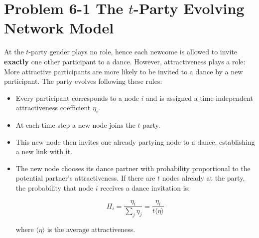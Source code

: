 \section{Problem 6-1 The $t$-Party Evolving Network Model}

At the $t$-party gender plays no role, hence each newcome is allowed to invite \textbf{exactly} one other participant to a dance. However, attractiveness plays a role: More attractive participants are more likely to be invited to a dance
by a new participant. The party evolves following these rules:

\begin{itemize}
	\item Every participant corresponds to a node $i$ and is assigned a time-independent attractiveness coefficient $\eta_i$.
	\item At each time step a new node joins the $t$-party.
	\item This new node then invites one already partying node to a dance, establishing a new link with it.
	\item The new node chooses its dance partner with probability proportional to the potential partner's attractiveness. If there are $t$ nodes already at the party, the probability that node $i$ receives a dance invitation is:
	
	\begin{equation*}
		\Pi_i = \frac{\eta_i}{\sum_{j}^{} \eta_j} = \frac{\eta_i}{t \langle \eta \rangle}
	\end{equation*}

	where $\langle \eta \rangle$ is the average attractiveness.
\end{itemize}


